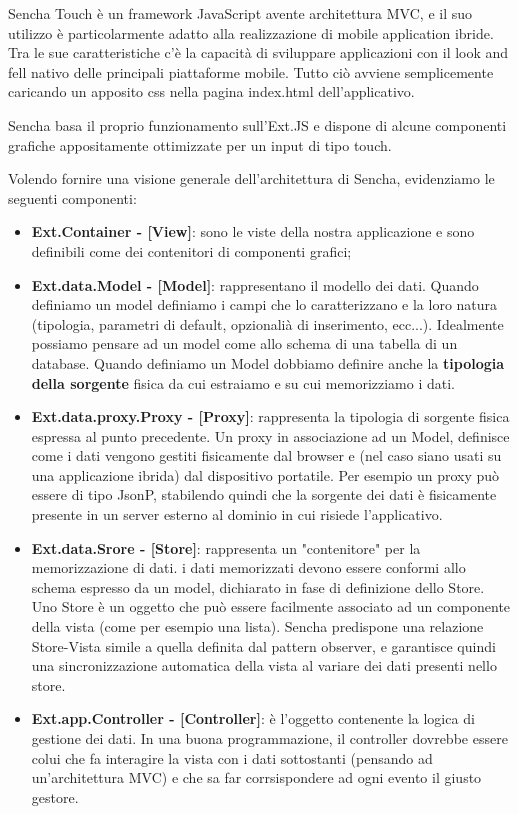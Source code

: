 \documentclass[10pt,a4paper,onecolumn]{article}
\begin{document}
Sencha Touch è un framework JavaScript avente architettura MVC, e il suo utilizzo è particolarmente adatto alla realizzazione di mobile application ibride. Tra le sue caratteristiche c'è la capacità di sviluppare applicazioni con il look and fell nativo delle principali piattaforme mobile. Tutto ciò avviene semplicemente caricando un apposito css nella pagina index.html dell'applicativo. 

Sencha basa il proprio funzionamento sull'Ext.JS e dispone di alcune componenti grafiche appositamente ottimizzate per un input di tipo touch. 

Volendo fornire una visione generale dell'architettura di Sencha, evidenziamo le seguenti componenti:

\begin{itemize}
	\item \textbf{Ext.Container - [View]}: sono le viste della nostra applicazione e sono definibili come dei contenitori di componenti grafici;
	\item \textbf{Ext.data.Model - [Model]}: rappresentano il modello dei dati. Quando definiamo un model definiamo i campi che lo caratterizzano e la loro natura (tipologia, parametri di default, opzionalià di inserimento, ecc...). Idealmente possiamo pensare ad un model come allo schema di una tabella di un database. Quando definiamo un Model dobbiamo definire anche la \textbf{tipologia della sorgente} fisica da cui estraiamo e su cui memorizziamo i dati. 
	\item \textbf{Ext.data.proxy.Proxy - [Proxy]}: rappresenta la tipologia di sorgente fisica espressa al punto precedente. Un proxy in associazione ad un Model, definisce come i dati vengono gestiti fisicamente dal browser e (nel caso siano usati su una applicazione ibrida) dal dispositivo portatile. Per esempio un proxy può essere di tipo JsonP, stabilendo quindi che la sorgente dei dati è fisicamente presente in un server esterno al dominio in cui risiede l'applicativo.
	\item \textbf{Ext.data.Srore - [Store]}: rappresenta un "contenitore" per la memorizzazione di dati. i dati memorizzati devono essere conformi allo schema espresso da un model, dichiarato in fase di definizione dello Store. Uno Store è un oggetto che può essere facilmente associato ad un componente della vista (come per esempio una lista). Sencha predispone una relazione Store-Vista simile a quella definita dal pattern observer, e garantisce quindi una sincronizzazione automatica della vista al variare dei dati presenti nello store.
	\item \textbf{Ext.app.Controller - [Controller]}: è l'oggetto contenente la logica di gestione dei dati. In una buona programmazione, il controller dovrebbe essere colui che fa interagire la vista con i dati sottostanti (pensando ad un'architettura MVC) e che sa far corrsispondere ad ogni evento il giusto gestore.
\end{itemize}
\end{document}
